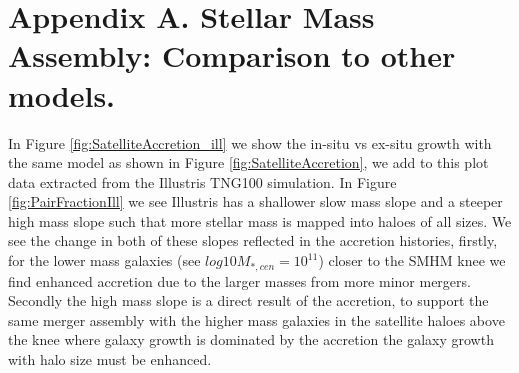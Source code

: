 
\chapter{Appendix A. Stellar Mass Assembly: Comparison to other models.}
\label{Appx:StellarMassAssembly}

In Figure \ref{fig:SatelliteAccretion_ill} we show the in-situ vs ex-situ growth with the same model as shown in Figure \ref{fig:SatelliteAccretion}, we add to this plot data extracted from the Illustris TNG100 simulation. In Figure \ref{fig:PairFractionIll} we see Illustris has a shallower slow mass slope and a steeper high mass slope such that more stellar mass is mapped into haloes of all sizes. We see the change in both of these slopes reflected in the accretion histories, firstly, for the lower mass galaxies (see $log 10 M_{*,cen} = 10^{11}$)  closer to the SMHM knee we find enhanced accretion due to the larger masses from more minor mergers. Secondly the high mass slope is a direct result of the accretion, to support the same merger assembly with the higher mass galaxies in the satellite haloes above the knee where galaxy growth is dominated by the accretion the galaxy growth with halo size must be enhanced.
 

